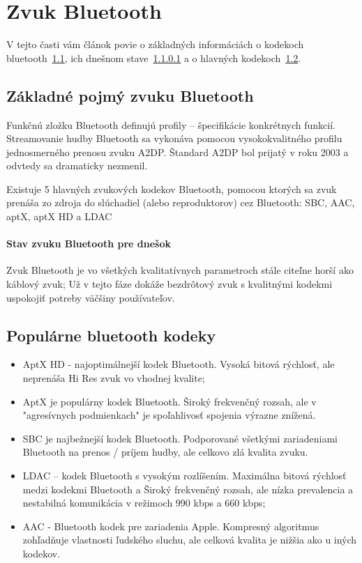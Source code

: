 \documentclass[10pt,twoside,slovak,a4paper]{article}
\begin{document}
\section{Zvuk Bluetooth} \label{bluetooth}

V tejto časti vám článok povie o základných informáciách o kodekoch bluetooth~\ref{zp}, ich dnešnom stave~\ref{sd} a o hlavných kodekoch~\ref{BKodeky}.

\subsection{Základné pojmý zvuku Bluetooth} \label{zp}

Funkčnú zložku Bluetooth definujú profily – špecifikácie konkrétnych funkcií. Streamovanie hudby Bluetooth sa vykonáva pomocou vysokokvalitného profilu jednosmerného prenosu zvuku A2DP. Štandard A2DP bol prijatý v roku 2003 a odvtedy sa dramaticky nezmenil.

Existuje 5 hlavných zvukových kodekov Bluetooth, pomocou ktorých sa zvuk prenáša zo zdroja do slúchadiel (alebo reproduktorov) cez Bluetooth: SBC, AAC, aptX, aptX HD a LDAC

\paragraph{Stav zvuku Bluetooth pre dnešok} \label{sd}

Zvuk Bluetooth je vo všetkých kvalitatívnych parametroch stále citeľne horší ako káblový zvuk;
Už v tejto fáze dokáže bezdrôtový zvuk s kvalitnými kodekmi uspokojiť potreby väčšiny používateľov.

\subsection {Populárne bluetooth kodeky} \label{BKodeky}

\begin{itemize}
\item AptX HD - najoptimálnejší kodek Bluetooth.
Vysoká bitová rýchlosť, ale neprenáša Hi Res zvuk vo vhodnej kvalite;

\item AptX je populárny kodek Bluetooth.
Široký frekvenčný rozsah, ale v "agresívnych podmienkach" je spoľahlivosť spojenia výrazne znížená.

\item SBC je najbežnejší kodek Bluetooth.
Podporované všetkými zariadeniami Bluetooth na prenos / príjem hudby, ale celkovo zlá kvalita zvuku.

\item LDAC – kodek Bluetooth s vysokým rozlíšením.
Maximálna bitová rýchlosť medzi kodekmi Bluetooth a
Široký frekvenčný rozsah, ale nízka prevalencia a nestabilná komunikácia v režimoch 990 kbps a 660 kbps;

\item AAC - Bluetooth kodek pre zariadenia Apple.
Kompresný algoritmus zohľadňuje vlastnosti ľudského sluchu, ale celková kvalita je nižšia ako u iných kodekov.
\end{itemize}
\end{document}
